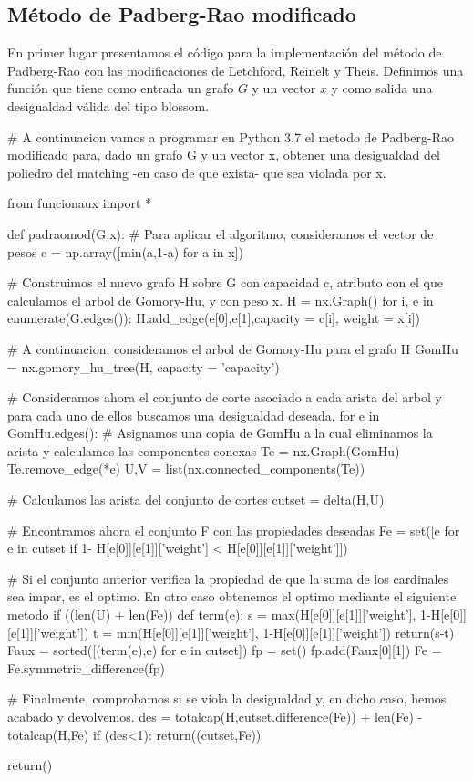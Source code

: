 \documentclass[twoside,a4paper,openright,12pt,tikz]{book}
\begin{document}
\subsection{Método de Padberg-Rao modificado}
En primer lugar presentamos el código para la implementación del método de Padberg-Rao con las modificaciones de Letchford, Reinelt y Theis. Definimos una función que tiene como entrada un grafo $G$ y un vector $x$ y como salida una desigualdad válida del tipo blossom. 
\begin{pythone}
# A continuacion vamos a programar en Python 3.7 el metodo de Padberg-Rao modificado para, dado un grafo G y un vector x, obtener una desigualdad del poliedro del matching -en caso de que exista- que sea violada por x.

from funcionaux import *

def padraomod(G,x):
    # Para aplicar el algoritmo, consideramos el vector de pesos
    c = np.array([min(a,1-a) for a in x])
    
    # Construimos el nuevo grafo H sobre G con capacidad c, atributo con el que calculamos el arbol de Gomory-Hu, y con peso x.
    H = nx.Graph()
    for i, e in enumerate(G.edges()):
        H.add_edge(e[0],e[1],capacity = c[i], weight = x[i])
        
    # A continuacion, consideramos el arbol de Gomory-Hu para el grafo H
    GomHu = nx.gomory_hu_tree(H, capacity = 'capacity')
    
    
    # Consideramos ahora el conjunto de corte asociado a cada arista del arbol y para cada uno de ellos buscamos una desigualdad deseada.
    for e in GomHu.edges():
        # Asignamos una copia de GomHu a la cual eliminamos la arista y calculamos las componentes conexas
        Te = nx.Graph(GomHu)
        Te.remove_edge(*e)
        U,V = list(nx.connected_components(Te))
        
        # Calculamos las arista del conjunto de cortes
        cutset = delta(H,U)
        
        #  Encontramos ahora el conjunto F con las propiedades deseadas 
        Fe = set([e for e in cutset if 1- H[e[0]][e[1]]['weight'] < 
              H[e[0]][e[1]]['weight']])
        
        # Si el conjunto anterior verifica la propiedad de que la suma de los cardinales sea impar, es el optimo. En otro caso obtenemos el optimo mediante el siguiente metodo
        if ((len(U) + len(Fe)) %
            def term(e):
                s = max(H[e[0]][e[1]]['weight'],
              	  1-H[e[0]][e[1]]['weight'])
                t = min(H[e[0]][e[1]]['weight'],
             	   1-H[e[0]][e[1]]['weight'])
                return(s-t)
            Faux = sorted([(term(e),e) for e in cutset])
            fp = set()
            fp.add(Faux[0][1])
            Fe = Fe.symmetric_difference(fp)
        
        # Finalmente, comprobamos si se viola la desigualdad y, en dicho caso, hemos acabado y devolvemos.
        des = totalcap(H,cutset.difference(Fe)) + len(Fe) - totalcap(H,Fe)
        if (des<1):
            return((cutset,Fe))
          
    return()
\end{pythone}
\newpage
\end{document}
